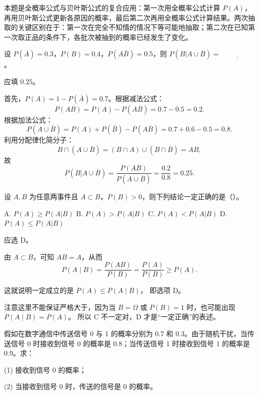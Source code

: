 ﻿\documentclass[lang=cn,11pt]{elegantbook}
\begin{document}
\begin{note}
本题是全概率公式与贝叶斯公式的复合应用：第一次用全概率公式计算 \(P(A)\)，再用贝叶斯公式更新各原因的概率，最后第二次再用全概率公式计算结果。两次抽取的关键区别在于：第一次在完全不知情的情况下等可能地抽取；第二次在已知第一次取正品的条件下，各批次被抽到的概率已经发生了变化。
\end{note}

\begin{exercise}\label{exer:1-21}
设 \(P(\overline{A}) = 0.3\)，\(P(B) = 0.4\)，\(P(A\overline{B}) = 0.5\)，则 \(P(B|A\cup\overline{B}) = \underline{\hspace{2cm}}\)。
\end{exercise}

\begin{solution}
应填 \(0.25\)。

首先，\(P(A) = 1 - P(\overline{A}) = 0.7\)。根据减法公式：
\[P(AB) = P(A) - P(A\overline{B}) = 0.7 - 0.5 = 0.2.\]
根据加法公式：
\[P(A\cup\overline{B}) = P(A) + P(\overline{B}) - P(A\overline{B}) = 0.7 + 0.6 - 0.5 = 0.8.\]
利用分配律化简分子：
\[B \cap (A\cup\overline{B}) = (B\cap A)\cup(B\cap\overline{B}) = AB,\]
故
\[P(B|A\cup\overline{B}) = \frac{P(AB)}{P(A\cup\overline{B})} = \frac{0.2}{0.8} = 0.25.\]
\end{solution}

\begin{exercise}\label{exer:1-22}
设 \(A, B\) 为任意两事件且 \(A\subset B\)，\(P(B) > 0\)，则下列结论一定正确的是（\quad）。\par
A. \(P(A) \ge P(A|B)\)\quad
B. \(P(A) > P(A|B)\)\quad
C. \(P(A) < P(A|B)\)\quad
D. \(P(A) \le P(A|B)\)
\end{exercise}

\begin{solution}
应选 D。

由 \(A\subset B\)，可知 \(AB=A\)，从而
\[
P(A\mid B)=\frac{P(AB)}{P(B)}=\frac{P(A)}{P(B)}\ge P(A).
\]

这就说明一定成立的是 \(P(A)\le P(A\mid B)\)，
即选项 D。

注意这里不能保证严格大于，因为当 \(B=\Omega\) 或 \(P(B)=1\) 时，也可能出现 \(P(A\mid B)=P(A)\)。
所以 C 不一定对，D 才是“一定正确”的表述。
\end{solution}

\begin{exercise}\label{exer:1-23}
假如在数字通信中传送信号 0 与 1 的概率分别为 0.7 和 0.3。由于随机干扰，当传送信号 0 时接收到信号 0 的概率是 0.8；当传送信号 1 时接收到信号 1 的概率是 0.9。求：\par
(1) 接收到信号 0 的概率；\par
(2) 当接收到信号 0 时，传送的信号是 0 的概率。
\end{exercise}
\end{document}
